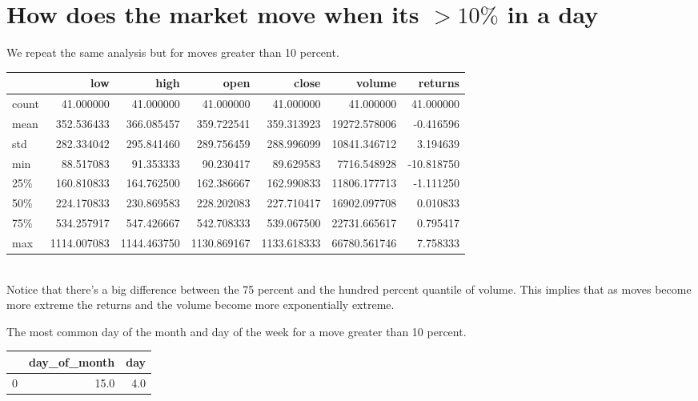 \section{ How does the market move when its $>10 \% $ in a day}
We repeat the same analysis but for moves greater than 10 percent.
\vspace{1cm}\\
\begin{tabular}{lrrrrrr}
\toprule
{} &          low &         high &         open &        close &        volume &    returns \\
\midrule
count &    41.000000 &    41.000000 &    41.000000 &    41.000000 &     41.000000 &  41.000000 \\
mean  &   352.536433 &   366.085457 &   359.722541 &   359.313923 &  19272.578006 &  -0.416596 \\
std   &   282.334042 &   295.841460 &   289.756459 &   288.996099 &  10841.346712 &   3.194639 \\
min   &    88.517083 &    91.353333 &    90.230417 &    89.629583 &   7716.548928 & -10.818750 \\
25\%   &   160.810833 &   164.762500 &   162.386667 &   162.990833 &  11806.177713 &  -1.111250 \\
50\%   &   224.170833 &   230.869583 &   228.202083 &   227.710417 &  16902.097708 &   0.010833 \\
75\%   &   534.257917 &   547.426667 &   542.708333 &   539.067500 &  22731.665617 &   0.795417 \\
max   &  1114.007083 &  1144.463750 &  1130.869167 &  1133.618333 &  66780.561746 &   7.758333 \\
\bottomrule
\end{tabular}
\vspace{1cm}\\
Notice that there's a big difference between the 75 percent and the hundred percent quantile of volume. This implies that as moves become more extreme the returns and the volume become more exponentially extreme. 

The most common day of the month and day of the week for a move greater than 10 percent.
\vspace{0.5cm}\\

\begin{tabular}{lrr}
\toprule
{} &  day\_of\_month &  day \\
\midrule
0 &          15.0 &  4.0 \\
\bottomrule
\end{tabular}

